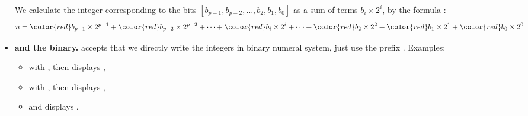 \documentclass[11pt,class=report,crop=false]{standalone}
\begin{document}
\begin{cours}[Binary]
\begin{itemize}
We calculate the integer corresponding to the bits $[b_{p-1},b_{p-2}, \ldots,b_2,b_1,b_0]$ as a sum of terms $b_i \times 2^i$, by the formula :
$$n = {\color{red}b_{p-1}} \times 2^{p-1} + {\color{red}b_{p-2}} \times 2^{p-2} + \cdots + {\color{red}b_i} \times 2^i +  \cdots + {\color{red}b_2} \times 2^2 + {\color{red}b_1} \times 2^1 + {\color{red}b_0} \times 2^0$$
  
    \item \textbf{\Python{} and the binary.} \Python{} accepts that we directly write the integers in binary numeral system, just use the prefix \og{}\fg{}.
    Examples:
    \begin{itemize}
      \item with , then  displays ,
      \item with , then  displays ,
      \item and  displays .
    \end{itemize} 
 \end{itemize}     

\end{cours}


\end{document}
